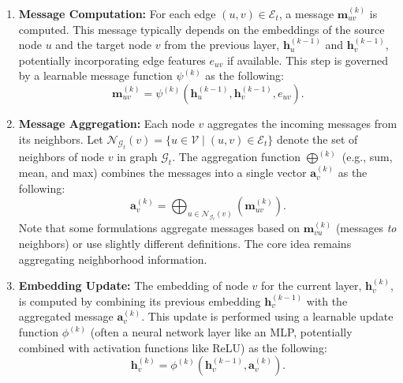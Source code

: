 \begin{enumerate}
    \item \textbf{Message Computation:} 
    For each edge \((u, v) \in \mathcal{E}_t\), 
    a message \(\mathbf{m}_{uv}^{(k)}\) is computed. 
    This message typically depends on the embeddings of the source node \(u\) and the target node \(v\) from the previous layer, 
    \(\mathbf{h}_u^{(k-1)}\) and \(\mathbf{h}_v^{(k-1)}\), 
    potentially incorporating edge features \(e_{uv}\) if available. 
    This step is governed by a learnable message function \(\psi^{(k)}\) as the following:
    \begin{equation}
    \label{eq:message}
    \mathbf{m}_{uv}^{(k)} = \psi^{(k)}\left(\mathbf{h}_u^{(k-1)}, \mathbf{h}_v^{(k-1)}, e_{uv}\right).
    \end{equation}

    \item \textbf{Message Aggregation:} Each node \(v\) aggregates the incoming messages from its neighbors. 
    Let \(\mathcal{N}_{\mathcal{G}_t}(v) = \{ u \in \mathcal{V} \mid (u, v) \in \mathcal{E}_t \} \) 
    denote the set of neighbors of node \(v\) in graph \(\mathcal{G}_t\). 
    The aggregation function \(\bigoplus^{(k)}\) (e.g., sum, mean, and max) combines the messages into a single vector 
    \(\mathbf{a}_v^{(k)}\) as the following:
    \begin{equation}
    \label{eq:aggregate}
        \mathbf{a}_v^{(k)} = \bigoplus_{u \in \mathcal{N}_{\mathcal{G}_t}(v)} \left( \mathbf{m}_{uv}^{(k)} \right).
    \end{equation}
    Note that some formulations aggregate messages based on \(\mathbf{m}_{vu}^{(k)}\) (messages \emph{to} neighbors) 
    or use slightly different definitions. 
    The core idea remains aggregating neighborhood information.
    \item \textbf{Embedding Update:} The embedding of node \(v\) for the current layer, 
    \(\mathbf{h}_v^{(k)}\), 
    is computed by combining its previous embedding \(\mathbf{h}_v^{(k-1)}\)
    with the aggregated message \(\mathbf{a}_v^{(k)}\). 
    This update is performed using a learnable update function \(\phi^{(k)}\) 
    (often a neural network layer like an MLP, 
    potentially combined with activation functions like ReLU) as the following:
    \begin{equation}
    \label{eq:update}
    \mathbf{h}_v^{(k)} = \phi^{(k)}\left(\mathbf{h}_v^{(k-1)}, \mathbf{a}_v^{(k)}\right).
    \end{equation}
\end{enumerate}

